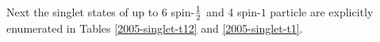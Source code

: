 \documentclass[pra,amsfonts,showpacs,preprint,showkeys]{revtex4}
\begin{document}
Next the singlet states of up to 6 spin-${1\over 2}$ and 4
spin-${1}$ particle are explicitly enumerated in
Tables \ref{2005-singlet-t12} and \ref{2005-singlet-t1}.




\end{document}
